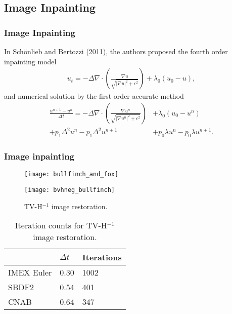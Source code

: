 \documentclass[hyperref={pdfpagelabels=false}]{beamer}
\begin{document}
\subsection{Image Inpainting} 
\begin{frame}
	\frametitle{Image Inpainting} 
	In Sch\"{o}nlieb and Bertozzi (2011), the authors proposed the fourth order inpainting model 
	\begin{align*}
	u_t = -\Delta \nabla \cdot\left( \frac{\nabla u}{\sqrt{\left\vert \nabla u \right\vert^2 + \epsilon^2}} \right) + \lambda_0 (u_0 - u),
	\end{align*}
	and numerical solution by the first order accurate method 
	\begin{align*}
	\frac{u^{n+1} - u^n}{\Delta t} 
	=  -\Delta \nabla \cdot\left( \frac{\nabla u^n}{\sqrt{\left\vert \nabla u^n \right\vert^2 + \epsilon^2}} \right) &+ \lambda_0 (u_0 - u^n) 
\\ +p_1\Delta^2u^n - p_1\Delta^2 u^{n+1} 
	&+ p_0\lambda u^n  - p_0\lambda u^{n+1}.
	\end{align*}
\end{frame}
\begin{frame}
	\frametitle{Image inpainting} 
	\begin{figure}
		\centering
\begin{minipage}{0.45\textwidth}
\centering
	\texttt{[image: bullfinch\_and\_fox]}
\end{minipage}
\begin{minipage}{0.45\textwidth}
\centering
        \texttt{[image: bvhneg\_bullfinch]}
\end{minipage}
\caption{TV-H$^{-1}$ image restoration.} 
	\end{figure}
\vspace{-15pt}
	\begin{table}[b]
		\centering 
	\caption{Iteration counts for TV-H$^{-1}$ image restoration.}
		\begin{tabular}{lll}
			\toprule 
			& $\Delta t$ & Iterations 
			\\ \midrule 
		IMEX Euler & 0.30 & 1002 
		\\ 
		SBDF2 & 0.54 & 401 
		\\ 
		CNAB & 0.64 & 347
		\\ \bottomrule
		\end{tabular}
	\end{table} 
\end{frame}
\end{document}
